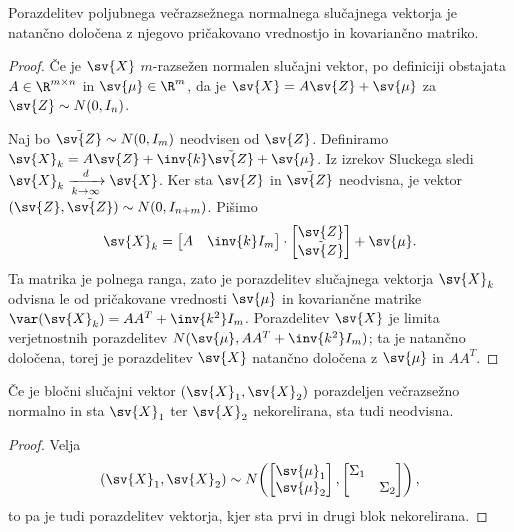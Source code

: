 
\begin{trditev}
  Porazdelitev poljubnega večrazsežnega normalnega slučajnega vektorja je
  natančno določena z njegovo pričakovano vrednostjo in kovariančno matriko.
\end{trditev}

\begin{proof}
  Če je $\sv{X}$ $m$-razsežen normalen slučajni vektor, po definiciji obstajata
  $A \in \R^{m \times n}$ in $\sv{\mu} \in \R^m$, da je $\sv{X} = A \sv{Z} +
  \sv{\mu}$ za $\sv{Z} \sim N(0, I_n)$.

  Naj bo $\tilde{\sv{Z}} \sim N(0, I_m)$ neodvisen od $\sv{Z}$.
  Definiramo $\sv{X}_k = A \sv{Z} + \inv{k} \tilde{\sv{Z}} + \sv{\mu}$.
  Iz izrekov Sluckega sledi $\sv{X}_k \xrightarrow[k \to \infty]{d} \sv{X}$.
  Ker sta $\sv{Z}$ in $\tilde{\sv{Z}}$ neodvisna, je vektor $(\sv{Z},
  \tilde{\sv{Z}}) \sim N(0, I_{n+m})$.
  Pišimo
  \[
	\sv{X}_k =
	\begin{bmatrix}
	  A & \inv{k} I_m
	\end{bmatrix}
	\cdot
	\begin{bmatrix}
	  \sv{Z} \\ \tilde{\sv{Z}}
	\end{bmatrix}
	+ \sv{\mu}.
  \]
  Ta matrika je polnega ranga, zato je porazdelitev slučajnega vektorja
  $\sv{X}_k$ odvisna le od pričakovane vrednosti $\sv{\mu}$ in kovariančne
  matrike $\var(\sv{X}_k) = A A^T + \inv{k^2} I_m$.
  Porazdelitev $\sv{X}$ je limita verjetnostnih porazdelitev $N(\sv{\mu}, A A^T
  + \inv{k^2} I_m)$; ta je natančno določena, torej je porazdelitev $\sv{X}$
  natančno določena z $\sv{\mu}$ in $A A^T$.
\end{proof}


\begin{trditev}
  Če je bločni slučajni vektor $(\sv{X}_1, \sv{X}_2)$ porazdeljen večrazsežno
  normalno in sta $\sv{X}_1$ ter $\sv{X}_2$ nekorelirana, sta tudi neodvisna.
\end{trditev}

\begin{proof}
  Velja
  \[
	(\sv{X}_1, \sv{X}_2) \sim N\!\left(
	  \begin{bmatrix}
		\sv{\mu}_1 \\ \sv{\mu}_2
	  \end{bmatrix},
	  \begin{bmatrix}
		\Sigma_1 & \\
		& \Sigma_2
	  \end{bmatrix}
	\right),
  \]
  to pa je tudi porazdelitev vektorja, kjer sta prvi in drugi blok nekorelirana.
\end{proof}

